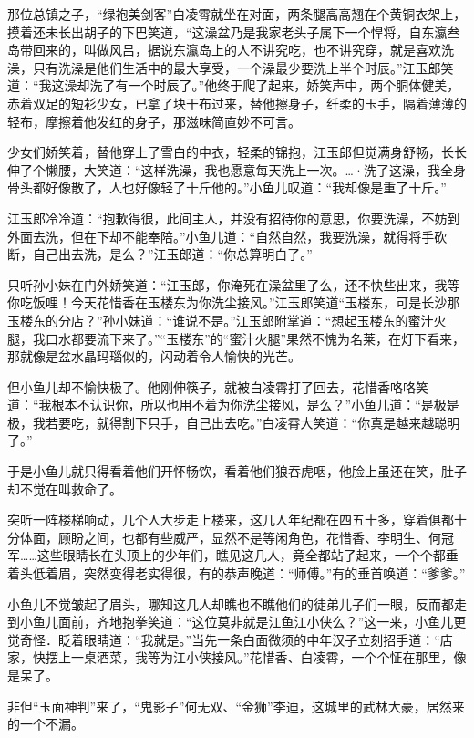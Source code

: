 \documentclass[12pt,oneside]{book}
\begin{document}
那位总镇之子，``绿袍美剑客''白凌霄就坐在对面，两条腿高高翘在个黄铜衣架上，摸着还未长出胡子的下巴笑道，``这澡盆乃是我家老头子属下一个悍将，自东瀛叁岛带回来的，叫做风吕，据说东瀛岛上的人不讲究吃，也不讲究穿，就是喜欢洗澡，只有洗澡是他们生活中的最大享受，一个澡最少要洗上半个时辰。''江玉郎笑道：``我这澡却洗了有一个时辰了。''他终于爬了起来，娇笑声中，两个胴体健美，赤着双足的短衫少女，已拿了块干布过来，替他擦身子，纤柔的玉手，隔着薄薄的轻布，摩擦着他发红的身子，那滋味简直妙不可言。

少女们娇笑着，替他穿上了雪白的中衣，轻柔的锦抱，江玉郎但觉满身舒畅，长长伸了个懒腰，大笑道：``这样洗澡，我也愿意每天洗上一次。\ldots·洗了这澡，我全身骨头都好像散了，人也好像轻了十斤他的。''小鱼儿叹道：``我却像是重了十斤。''

江玉郎冷冷道：``抱歉得很，此间主人，并没有招待你的意思，你要洗澡，不妨到外面去洗，但在下却不能奉陪。''小鱼儿道：``自然自然，我要洗澡，就得将手砍断，自己出去洗，是么？''江玉郎道：``你总算明白了。''

只听孙小妹在门外娇笑道：``江玉郎，你淹死在澡盆里了么，还不快些出来，我等你吃饭哩！今天花惜香在玉楼东为你洗尘接风。''江玉郎笑道``玉楼东，可是长沙那玉楼东的分店？''孙小妹道：``谁说不是。''江玉郎附掌道：``想起玉楼东的蜜汁火腿，我口水都要流下来了。''``玉楼东''的``蜜汁火腿''果然不愧为名莱，在灯下看来，那就像是盆水晶玛瑙似的，闪动着令人愉快的光芒。

但小鱼儿却不愉快极了。他刚伸筷子，就被白凌霄打了回去，花惜香咯咯笑道：``我根本不认识你，所以也用不着为你洗尘接风，是么？''小鱼儿道：``是极是极，我若要吃，就得割下只手，自己出去吃。''白凌霄大笑道：``你真是越来越聪明了。''

于是小鱼儿就只得看着他们开怀畅饮，看着他们狼吞虎咽，他脸上虽还在笑，肚子却不觉在叫救命了。

突听一阵楼梯响动，几个人大步走上楼来，这几人年纪都在四五十多，穿着俱都十分体面，顾盼之间，也都有些威严，显然不是等闲角色，花惜香、李明生、何冠军\ldots\ldots 这些眼睛长在头顶上的少年们，瞧见这几人，竟全都站了起来，一个个都垂着头低着眉，突然变得老实得很，有的恭声晚道：``师傅。''有的垂首唤道：``爹爹。''

小鱼儿不觉皱起了眉头，哪知这几人却瞧也不瞧他们的徒弟儿子们一眼，反而都走到小鱼儿面前，齐地抱拳笑道：``这位莫非就是江鱼江小侠么？''这一来，小鱼儿更觉奇怪．眨着眼睛道：``我就是。''当先一条白面微须的中年汉子立刻招手道：``店家，快摆上一桌酒菜，我等为江小侠接风。''花惜香、白凌霄，一个个怔在那里，像是呆了。

非但``玉面神判''来了，``鬼影子''何无双、``金狮''李迪，这城里的武林大豪，居然来的一个不漏。
\end{document}
